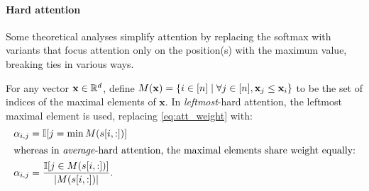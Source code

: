 \iffalse
Our definition deviates from the original formulation \citep{vaswani-etal-2017 attention} and commonly-used implementations in a few ways:
\begin{compactenum}
    \item Originally, $\qproj$ and $\kproj$ had $d_\text{k}$ output dimensions and $\vproj$ had $d_\text{v}$ output dimensions, and $d_\text{k}=d_\text{v}$. Here, we set all three to $\dhid$, aligning with common practice in implementations.
    \item Originally, $\outmap$ was defined as part of multi-head attention, but we have moved it into attention.
    This does not change the model.
    \item \Cref{eq:att_weight} is equivalent to the more usual matrix form $\softmax\mleft(\frac{\mat{Q}\mat{K}^\top}{\sqrt{\dhid}}\mright)\mat{V}$, where $\mat{Q} \in \R^{n\times\dhid}$ is a matrix whose $i$-th row corresponds to $\qproj(\mathbf{X})$, and similarly for $\mat{K}$ and $\mat{V}$.
    \item Some implementations use affine instead of linear transformations for $\qproj$, $\kproj$, and $\vproj$, and some include a bias term in $s_{i,j}(\mathbf{X})$.
\end{compactenum}
Since our focus here is solely on scaled dot-product attention, we will refer to it simply as \emph{attention}.
\fi

\iffalse
\insentpara{Multi-head attention} with $\dhid$ key/value dimensions per head is the sum of $\numheads$ attentions with $\dhid$ key/value dimensions: %
\begin{equation*}
\mha(\mathbf{x},\mathbf{X})= \sum_{h\in[\numheads]}\att_h(\mathbf{x},\mathbf{X}).
\end{equation*}
Multi-head self attention is defined analogously.
This is equivalent to the original formulation, which concatenated the outputs of the heads and passed the result through a shared, larger, $\outmap$.
\fi

\paragraph{Hard attention}
Some theoretical analyses simplify attention by replacing the softmax with variants that focus attention only on the position(s) with the maximum value, breaking ties in various ways.

For any vector $\mathbf{x} \in \mathbb{R}^d$, define $M(\mathbf{x}) = \{i \in [n] \mid \forall j \in [n], \mathbf{x}_{j} \le \mathbf{x}_{i}\}$ to be the set of indices of the maximal elements of $\mathbf{x}$.
In \emph{leftmost}-hard attention, the leftmost maximal element is used, replacing \cref{eq:att_weight} with:
\begin{align}
    \alpha_{i,j} &= \mathbb{I}[j = \min M(s[i,:])] \\
\intertext{whereas in \emph{average}-hard attention, the maximal elements share weight equally:}
    \alpha_{i,j} &= \frac{\mathbb{I}[j \in M(s[i,:])]}{|M(s[i,:])|}.
\end{align}

